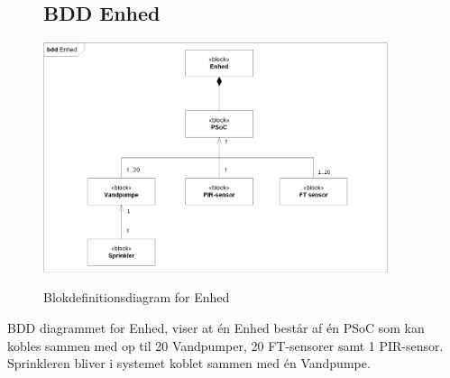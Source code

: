 \begin{figure}[H] \centering
\subsection{BDD Enhed}
{\includegraphics[width=0.9\textwidth]{filer/systemarkitektur/BDD_Enhed}}
\caption{Blokdefinitionsdiagram for Enhed}
\label{lab:bddenhed}
\raggedright
\end{figure}

BDD diagrammet for Enhed, viser at én Enhed består af én PSoC som kan kobles sammen med op til 20 Vandpumper, 20 FT-sensorer samt 1 PIR-sensor. Sprinkleren bliver i systemet koblet sammen med én Vandpumpe.


